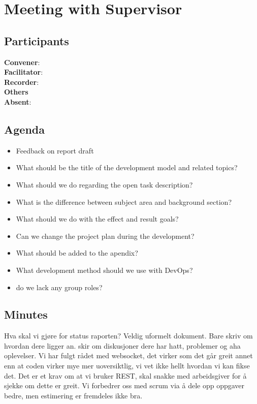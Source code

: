 \section*{Meeting with Supervisor}

\subsection*{Participants}

\textbf{Convener}: \supervisor{}        \\
\textbf{Facilitator}: \facilitator{}    \\
\textbf{Recorder}: \scrummaster{}       \\
\textbf{Others}                         \\
\textbf{Absent}: \groupleader{}

\subsection*{Agenda}
\begin{itemize}
    \item Feedback on report draft
    \item What should be the title of the development model and related topics?
    \item What should we do regarding the open task description? 
    \item What is the difference between subject area and background section?
    \item What should we do with the effect and result goals?
    \item Can we change the project plan during the development?
    \item What should be added to the apendix?
    \item What development method should we use with DevOps?
    \item do we lack any group roles?
\end{itemize}

\subsection*{Minutes}

Hva skal vi gjøre for status raporten?
Veldig uformelt dokument. Bare skriv om hvordan dere ligger an. skir om diskusjoner dere har hatt, problemer og aha oplevelser. 
Vi har fulgt rådet med websocket, det virker som det går greit annet enn at coden virker mye mer uoversiktlig, vi vet ikke hellt hvordan vi kan fikse det. Det er et krav om at vi bruker REST, skal snakke med arbeidsgiver for å sjekke om dette er greit. Vi forbedrer oss med scrum via å dele opp oppgaver bedre, men estimering er fremdeles ikke bra.
\newpage
